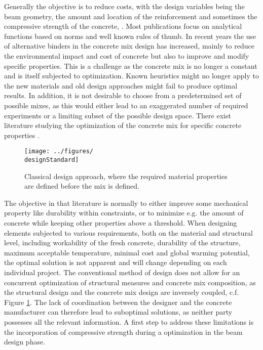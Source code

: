 Generally the objective is to reduce costs, with the design variables being the beam geometry, the amount and location of the reinforcement and sometimes the compressive strength of the concrete, \cite{Chakrabarty_1992, Coello_1997, Pierott_2021, Shobeiri_2023} .
Most publications focus on analytical functions based on norms and well known rules of thumb.
In recent years the use of alternative binders in the concrete mix design has increased, mainly to reduce the environmental impact and cost of concrete but also to improve and modify specific properties.
This is a challenge as the concrete mix is no longer a constant and is itself subjected to optimization.
Known heuristics might no longer apply to the new materials and old design approaches might fail to produce optimal results.
In addition, it is not desirable to choose from a predetermined set of possible mixes, as this would either lead to an exaggerated number of required experiments or a limiting subset of the possible design space.
There exist literature studying the optimization of the concrete mix for specific concrete properties \cite{Lisienkova_2021, Kondapally_2022}.
\begin{figure}[b]%
	\centering
	\texttt{[image: ../figures/\\designStandard]}
	\caption{Classical design approach, where the required material properties are defined before the mix is defined. }\label{fig:standard_design}
\end{figure}
The objective in that literature is normally to either improve some mechanical property like durability within constraints, or to minimize e.g. the amount of concrete while keeping other properties above a threshold.
When designing elements subjected to various requirements, both on the material and structural level, including workability of the fresh concrete, durability of the structure, maximum acceptable temperature, minimal cost and global warming potential, the optimal solution is not apparent and will change depending on each individual project.
The conventional method of design does not allow for an concurrent optimization of structural measures and concrete mix composition, as the structural  design and the concrete mix design are inversely coupled, c.f. Figure \ref{fig:standard_design}.
The lack of coordination between the designer and the concrete manufacturer can therefore lead to suboptimal solutions, as neither party possesses all the relevant information.
A first step to address these limitations is the incorporation of compressive strength during a optimization in the beam design phase.
